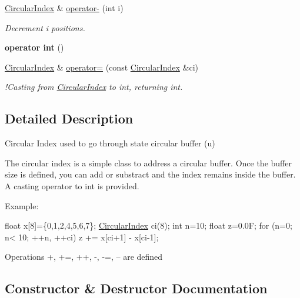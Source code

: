 \begin{DoxyCompactItemize}
\hyperlink{classupc_1_1CircularIndex}{Circular\+Index} \& \hyperlink{classupc_1_1CircularIndex_a7745755030622a01389f2133632d7f76}{operator-\/} (int i)
\begin{DoxyCompactList}\small\item\em Decrement \textquotesingle{}i\textquotesingle{} positions. \end{DoxyCompactList}\item 
\mbox{\label{classupc_1_1CircularIndex_ab0961d598cc0a51a2990e8823f71a332}} 
{\bfseries operator int} ()
\item 
\mbox{\label{classupc_1_1CircularIndex_ab23f2d6ba2b5781153bcf6383cce8afc}} 
\hyperlink{classupc_1_1CircularIndex}{Circular\+Index} \& \hyperlink{classupc_1_1CircularIndex_ab23f2d6ba2b5781153bcf6383cce8afc}{operator=} (const \hyperlink{classupc_1_1CircularIndex}{Circular\+Index} \&ci)
\begin{DoxyCompactList}\small\item\em !\+Casting from \hyperlink{classupc_1_1CircularIndex}{Circular\+Index} to int, returning int. \end{DoxyCompactList}\end{DoxyCompactItemize}


\subsection{Detailed Description}
Circular Index used to go through state circular buffer (u) 

The circular index is a simple class to address a circular buffer. Once the buffer size is defined, you can add or substract and the index remains inside the buffer. A casting operator to int is provided.

Example\+: 
\begin{DoxyCode}
\textcolor{keywordtype}{float} x[8]=\{0,1,2,4,5,6,7\};
\hyperlink{classupc_1_1CircularIndex_a80c03ec94380d80132ca01b39ef9b0e7}{CircularIndex} ci(8);
\textcolor{keywordtype}{int} n=10; \textcolor{keywordtype}{float} z=0.0F;
\textcolor{keywordflow}{for} (n=0; n< 10; ++n, ++ci)
    z += x[ci+1] - x[ci-1];
\end{DoxyCode}
 Operations +, +=, ++, -\/, -\/=, -- are defined 

\subsection{Constructor \& Destructor Documentation}
\mbox{\label{classupc_1_1CircularIndex_a80c03ec94380d80132ca01b39ef9b0e7}} 
